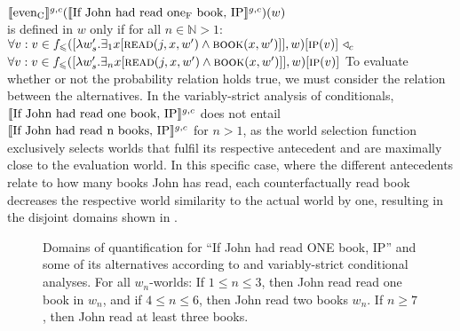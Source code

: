 \ex
$\intension[g,c]{even\textsubscript{C}}(\intension[g,c]{If John had read one\textsubscript{F} book, IP})(w)$\\ is defined in $w$ only if for all $n\in\mathbb{N}>1$:\\
$\forall v:v\in f_\leqslant([\lambda w'_s.\exists_1{x}[\predicate{read}(j,x,w')\land\predicate{book}(x,w')]],w)[\predicate{ip}(v)]~\lprob_c$\\\emptyfill$\forall v:v\in f_\leqslant([\lambda w'_s.\exists_n{x}[\predicate{read}(j,x,w')\land\predicate{book}(x,w')]],w)[\predicate{ip}(v)]$
\xe
To evaluate whether or not the probability relation holds true, we must consider the relation between the alternatives. In the variably-strict analysis of conditionals, $\intension[g,c]{If John had read one book, IP}$ does not entail $\intension[g,c]{If John had read n books, IP}$ for $n>1$, as the world selection function exclusively selects worlds that fulfil its respective antecedent and are maximally close to the evaluation world. In this specific case, where the different antecedents relate to how many books John has read, each counterfactually read book decreases the respective world similarity to the actual world by one, resulting in the disjoint domains shown in . 
\begin{figure}[!htb]
    \centering
    \resizebox{\linewidth}{!}{}
    \caption{Domains of quantification for \enquote{If John had read \MakeUppercase{one} book, IP} and some of its alternatives according to \textcite{Stalnaker1968} and  variably-strict conditional analyses. For all $w_n$-worlds: If $1\leqslant n\leqslant 3$, then John read read one book in $w_n$, and if $4\leqslant n\leqslant 6$, then John read two books $w_n$. If $n\geqslant 7$, then John read at least three books.}
\end{figure}
